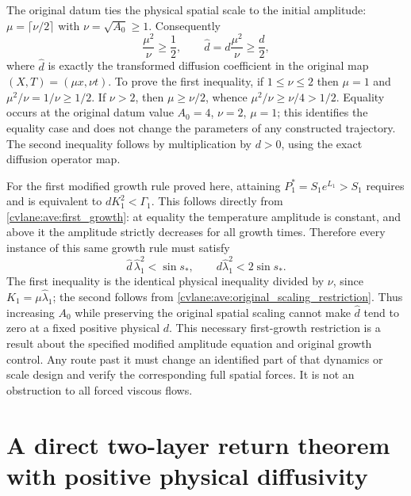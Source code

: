 The original datum ties the physical spatial scale to the initial
amplitude: $\mu=\lceil\nu/2\rceil$ with $\nu=\sqrt{A_0}\geq1$.
Consequently
\begin{equation}\label{cvlane:ave:original_scaling_restriction}
 \frac{\mu^2}{\nu}\geq\frac12,
 \qquad \widehat d=d\frac{\mu^2}{\nu}\geq\frac d2,
\end{equation}
where $\widehat d$ is exactly the transformed diffusion coefficient
in the original map $(X,T)=(\mu x,\nu t)$.
To prove the first inequality, if $1\leq\nu\leq2$ then $\mu=1$
and $\mu^2/\nu=1/\nu\geq1/2$. If $\nu>2$, then
$\mu\geq\nu/2$, whence $\mu^2/\nu\geq\nu/4>1/2$.
Equality occurs at the original datum value $A_0=4$, $\nu=2$, $\mu=1$;
this identifies the equality case and does not change the parameters
of any constructed trajectory. The second inequality follows by
multiplication by $d>0$, using the exact diffusion operator map.

For the first modified growth rule proved here, attaining
$P_1^*=S_1e^{L_1}>S_1$ requires and is equivalent to
$dK_1^2<\Gamma_1$. This follows directly from
\eqref{cvlane:ave:first_growth}: at equality the temperature amplitude is
constant, and above it the amplitude strictly decreases for all growth
times. Therefore every instance of this same growth rule must satisfy
\begin{equation}\label{cvlane:ave:necessary_first_growth}
 \widehat d\,\widehat\lambda_1^2<\sin s_*,\qquad
 d\widehat\lambda_1^2<2\sin s_*.
\end{equation}
The first inequality is the identical physical inequality divided by
$\nu$, since $K_1=\mu\widehat\lambda_1$; the second follows from
\eqref{cvlane:ave:original_scaling_restriction}.
Thus increasing $A_0$ while preserving the original spatial scaling
cannot make $\widehat d$ tend to zero at a fixed positive physical $d$.
This necessary first-growth restriction is a result about the specified
modified amplitude equation and original growth control. Any route
past it must change an identified part of that dynamics or scale
design and verify the corresponding full spatial forces. It is not
an obstruction to all forced viscous flows.


\section{A direct two-layer return theorem with positive physical diffusivity}
\label{cvlane:sr:section}

